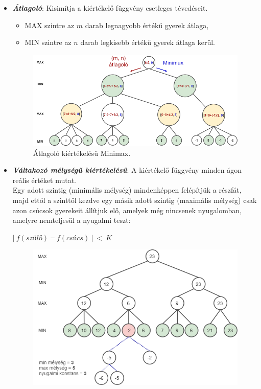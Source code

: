 \documentclass[12pt,margin=0px]{article}
\begin{document}
{        \begin{itemize}
            \item \textbf{\emph{Átlagoló}}: Kisimítja a kiértékelő függvény esetleges tévedéseit.
            \begin{itemize}
                \item MAX szintre az $m$ darab legnagyobb értékű gyerek átlaga,
                \item MIN szintre az $n$ darab legkisebb értékű gyerek átlaga kerül.
            \end{itemize}
            \begin{figure}[H]
		      \centering
                \includegraphics[width=0.8\linewidth]{img/avgminmax_sample.png}
		      \caption{Átlagoló kiértékelésű Minimax.}
		      \label{fig:avgminmax}
	       \end{figure}
            \item \textbf{\emph{Váltakozó mélységű kiértékelésű}}: A kiértékelő függvény minden ágon reális értéket mutat.\\
            Egy adott szintig (minimális mélység) mindenképpen felépítjük a részfát, majd ettől a szinttől kezdve egy másik adott szintig (maximális mélység) csak azon csúcsok gyerekeit állítjuk elő, amelyek még nincsenek nyugalomban, amelyre nemteljesül a nyugalmi teszt:
                \begin{center}
                $\Big|\ f(\textit{szülő})\ ‒\ f(\textit{csúcs})\ \Big|\ <\ K$\\
                \end{center}
            \begin{figure}[H]
		      \centering
                \includegraphics[width=0.8\linewidth]{img/variable_depth_minmax.png}

\end{figure}
\end{itemize}}
\end{document}
